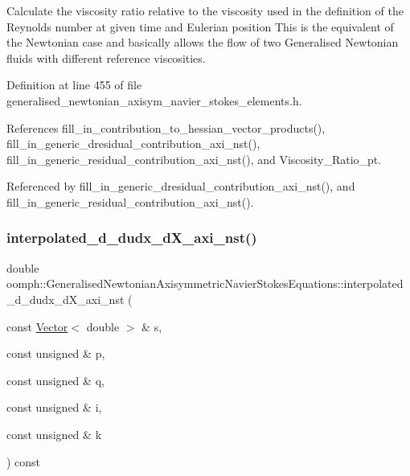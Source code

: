Calculate the viscosity ratio relative to the viscosity used in the definition of the Reynolds number at given time and Eulerian position This is the equivalent of the Newtonian case and basically allows the flow of two Generalised Newtonian fluids with different reference viscosities. 



Definition at line 455 of file generalised\+\_\+newtonian\+\_\+axisym\+\_\+navier\+\_\+stokes\+\_\+elements.\+h.



References fill\+\_\+in\+\_\+contribution\+\_\+to\+\_\+hessian\+\_\+vector\+\_\+products(), fill\+\_\+in\+\_\+generic\+\_\+dresidual\+\_\+contribution\+\_\+axi\+\_\+nst(), fill\+\_\+in\+\_\+generic\+\_\+residual\+\_\+contribution\+\_\+axi\+\_\+nst(), and Viscosity\+\_\+\+Ratio\+\_\+pt.



Referenced by fill\+\_\+in\+\_\+generic\+\_\+dresidual\+\_\+contribution\+\_\+axi\+\_\+nst(), and fill\+\_\+in\+\_\+generic\+\_\+residual\+\_\+contribution\+\_\+axi\+\_\+nst().

\mbox{\label{classoomph_1_1GeneralisedNewtonianAxisymmetricNavierStokesEquations_a25970a1e42928fce5e110a40aa79c0de}} 
\subsubsection{\texorpdfstring{interpolated\+\_\+d\+\_\+dudx\+\_\+d\+X\+\_\+axi\+\_\+nst()}{interpolated\_d\_dudx\_dX\_axi\_nst()}}
{\footnotesize\ttfamily double oomph\+::\+Generalised\+Newtonian\+Axisymmetric\+Navier\+Stokes\+Equations\+::interpolated\+\_\+d\+\_\+dudx\+\_\+d\+X\+\_\+axi\+\_\+nst (\begin{DoxyParamCaption}\item[{const \hyperlink{classoomph_1_1Vector}{Vector}$<$ double $>$ \&}]{s,  }\item[{const unsigned \&}]{p,  }\item[{const unsigned \&}]{q,  }\item[{const unsigned \&}]{i,  }\item[{const unsigned \&}]{k }\end{DoxyParamCaption}) const\hspace{0.3cm}{\ttfamily [inline]}}



